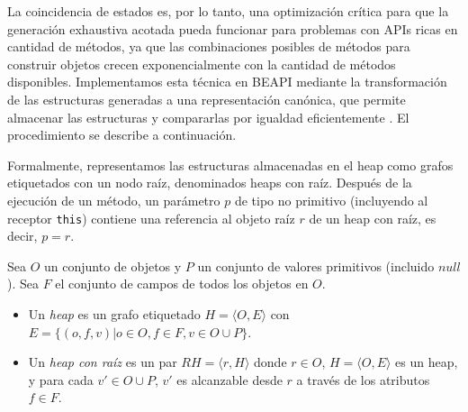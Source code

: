 La coincidencia de estados es, por lo tanto, una optimización crítica para que
la generación exhaustiva acotada pueda funcionar para problemas con APIs ricas
en cantidad de métodos, ya que las combinaciones posibles de métodos para
construir objetos crecen exponencialmente con la cantidad de métodos
disponibles.
Implementamos esta técnica en \textsf{BEAPI} mediante la transformación de las
estructuras generadas a una representación canónica, que permite almacenar las  
estructuras y compararlas por igualdad eficientemente \cite{Iosif02,Xie04}. El procedimiento se
describe a continuación.


Formalmente, representamos las estructuras almacenadas en el heap como grafos
etiquetados con un nodo raíz, denominados heaps con raíz. 
Después de la ejecución de un método, un parámetro $p$ de tipo no primitivo
(incluyendo al receptor \texttt{this}) contiene una referencia al objeto raíz $r$ de un
heap con raíz, es decir, $p=r$.

\begin{definition}
Sea $O$ un conjunto de objetos y $P$ un conjunto de valores primitivos (incluido $null$). Sea $F$ el conjunto de campos de todos los objetos en $O$.
\begin{itemize}
\item Un \emph{heap} es un grafo etiquetado $H = \langle O, E\rangle$ con $E =
    \{(o, f, v) | o \in O, f \in F, v \in O \cup P\}$.
\item Un \emph{heap con raíz} es un par $RH = \langle r, H \rangle$ donde $r \in
    O$, $H = \langle O, E\rangle$ es un heap, y para cada $v' \in O \cup P$,
    $v'$ es alcanzable desde $r$ a través de los atributos $f \in F$.
\end{itemize}
\end{definition}

